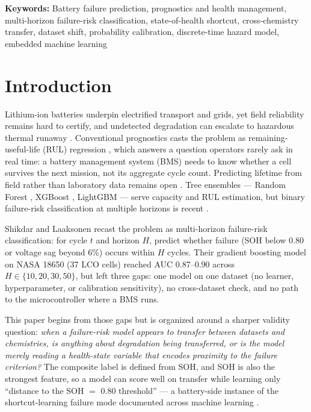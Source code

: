 \documentclass[11pt,a4paper]{article}
\begin{document}
\medskip
\noindent\textbf{Keywords:} Battery failure prediction, prognostics and health management, multi-horizon failure-risk classification, state-of-health shortcut, cross-chemistry transfer, dataset shift, probability calibration, discrete-time hazard model, embedded machine learning

\bigskip
\noindent
\section{Introduction}
Lithium-ion batteries underpin electrified transport and grids, yet field reliability remains hard to certify, and undetected degradation can escalate to hazardous thermal runaway \cite{feng2018thermal}. Conventional prognostics casts the problem as remaining-useful-life (RUL) regression \cite{meng2019review,roman2021machine,ng2020predicting}, which answers a question operators rarely ask in real time: a battery management system (BMS) \cite{hannan2017review} needs to know whether a cell survives the next mission, not its aggregate cycle count. Predicting lifetime from field rather than laboratory data remains open \cite{sulzer2021challenge}. Tree ensembles --- Random Forest \cite{breiman2001random}, XGBoost \cite{chen2016xgboost}, LightGBM \cite{ke2017lightgbm} --- serve capacity and RUL estimation, but binary failure-risk classification at multiple horizons is recent \cite{shikdar2026learning}.

Shikdar and Laaksonen \cite{shikdar2026learning} recast the problem as multi-horizon failure-risk classification: for cycle $t$ and horizon $H$, predict whether failure (SOH below 0.80 or voltage sag beyond 6\%) occurs within $H$ cycles. Their gradient boosting model on NASA 18650 (37 LCO cells) reached AUC 0.87--0.90 across $H \in \{10,20,30,50\}$, but left three gaps: one model on one dataset (no learner, hyperparameter, or calibration sensitivity), no cross-dataset check, and no path to the microcontroller where a BMS runs.

This paper begins from those gaps but is organized around a sharper validity question: \emph{when a failure-risk model appears to transfer between datasets and chemistries, is anything about degradation being transferred, or is the model merely reading a health-state variable that encodes proximity to the failure criterion?} The composite label is defined from SOH, and SOH is also the strongest feature, so a model can score well on transfer while learning only ``distance to the SOH $=$ 0.80 threshold'' --- a battery-side instance of the shortcut-learning failure mode documented across machine learning \cite{geirhos2020shortcut}.
\end{document}
